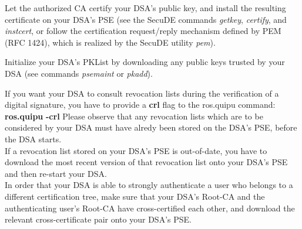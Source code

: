 \m Let the authorized CA certify your DSA's public key, and install the resulting certificate
   on your DSA's PSE (see the SecuDE commands {\em getkey}, {\em certify}, and {\em instcert}, or 
   follow the certification request/reply mechanism defined by PEM (RFC 1424), which is realized by
   the SecuDE utility {\em pem}).

\m Initialize your DSA's PKList by downloading any public keys trusted by your DSA
   (see commands {\em psemaint} or {\em pkadd}).
\ee

If you want your DSA to consult revocation lists during the verification of a digital 
signature, you have to provide a {\bf crl} flag to the ros.quipu command:
\bvtab
\1 {\bf ros.quipu} {\bf -crl}
\evtab
Please observe that any revocation lists which are to be considered
by your DSA must have alredy been stored on the DSA's PSE, before the
DSA starts.
\\ [1em]
If a revocation list stored on your DSA's PSE is out-of-date, you have
to download the most recent version of that revocation list onto your 
DSA's PSE and then re-start your DSA.
\\ [1em]
In order that your DSA is able to strongly authenticate a user who
belongs to a different certification tree, make sure that your DSA's
Root-CA and the authenticating user's Root-CA have cross-certified each other, 
and download the relevant cross-certificate pair onto your DSA's PSE.


